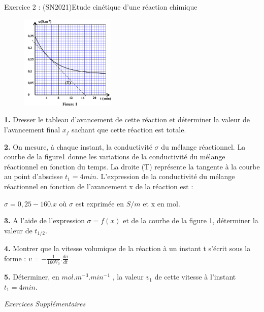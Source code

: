 \documentclass[12pt, french]{article}
\begin{document}
\begin{Box2}{Exercice 2 : (SN2021)Etude cinétique d’une réaction chimique }
\begin{figure}
  \begin{center}
	\includegraphics[width=0.4\textwidth]{./img/suivi_02.png}
  \end{center}
\end{figure}


  \textbf{1. } Dresser le tableau d’avancement de cette réaction et déterminer la valeur de l’avancement final $x_f$
sachant que cette réaction est totale.

\textbf{2. } On mesure, à chaque instant, la conductivité $\sigma$ du
mélange réactionnel.
La courbe de la figure1 donne les variations de la
conductivité du mélange réactionnel en fonction du
temps.
La droite (T) représente la tangente à la courbe au point
d’abscisse $t_1 = 4 min$.
L’expression de la conductivité du mélange réactionnel
en fonction de l’avancement x de la réaction est : 

$\sigma = 0,25 - 160.x$  où $\sigma$ est exprimée en $S/m$ et x en mol.

\textbf{3. } A l’aide de l’expression $\sigma = f(x)$ et de la courbe de la figure 1, déterminer la valeur de $t_{1/2}$.

  \textbf{4. } Montrer que la vitesse volumique de la réaction à un instant t s’écrit sous la forme : $v = -\frac{1}{160V_0}.\frac{d\sigma}{dt}$

\textbf{5. } Déterminer, en $mol.m^{-3}.min^{-1}$ , la valeur $v_1$ de cette vitesse à l’instant $t_1= 4 min$.

\end{Box2}

\vspace{-0.8cm}
\begin{center}
   \Large{ \em{Exercices Supplémentaires}}
\end{center}
\end{document}

